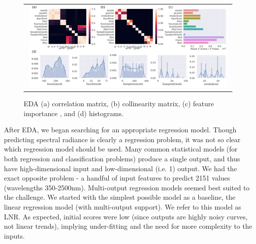 
\begin{figure} [b]
\begin{center}
\begin{tabular}{c}
\includegraphics[width=0.98\textwidth]{img/eda.jpg}
\end{tabular}
\end{center}
\caption[eda] { \label{fig:eda}EDA (a) correlation matrix, (b) collinearity matrix, (c) feature importance , and (d) histograms.}
\end{figure}

After EDA, we began searching for an appropriate regression model. Though predicting spectral radiance is clearly a regression problem, it was not so clear which regression model should be used. Many common statistical models (for both regression and classification problems) produce a single output, and thus have high-dimensional input and low-dimensional (i.e. 1) output. We had the exact opposite problem - a handful of input features to predict 2151 values (wavelengths 350-2500nm). Multi-output regression models seemed best suited to the challenge. We started with the simplest possible model as a baseline, the linear regression model (with multi-output support). We refer to this model as LNR. As expected, initial scores were low (since outputs are highly noisy curves, not linear trends), implying under-fitting and the need for more complexity to the inputs.

